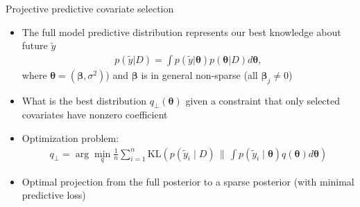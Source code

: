 \documentclass[english,t]{beamer}
\newcommand{\KLx}[2] { \mathrm{KL} {\left(#1 \, \| \, #2\right)} }
\newcommand{\vs}[1] { \boldsymbol{#1} }
\begin{document}
\begin{frame}

  {\Large\color{navyblue} {Projective predictive covariate selection}}
    
\begin{itemize}
\item The full model predictive distribution represents our best knowledge about future $\tilde{y}$
	\begin{align*}
          p(\tilde{y} | D) = \int p(\tilde{y} | \vs\theta) p(\vs \theta| D) d\vs\theta,
        \end{align*}
        where $\vs \theta=(\vs \beta,\sigma^2)$) and $\vs \beta$ is in general non-sparse (all $\vs\beta_j \ne 0$)
	\item What is the best distribution $q_\perp(\vs \theta)$ given a
          constraint that only selected covariates have nonzero coefficient
	\item Optimization problem:
	\begin{align*}
		q_\perp = \arg \min_{q} \frac{1}{n} \sum_{i=1}^n 
			\KLx{p(\tilde{y}_i \mid D)}{\int p(\tilde{y}_i \mid \vs \theta) q(\vs \theta) d\vs\theta}%
	\end{align*}
      \item Optimal projection from the full posterior to a sparse
        posterior (with minimal predictive loss)
\end{itemize}

\end{frame}
\end{document}
